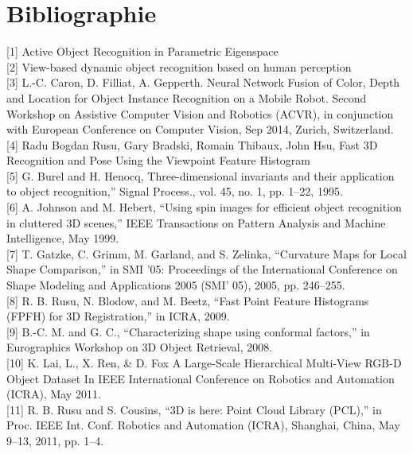 \chapter{Bibliographie}

[1] Active Object Recognition in Parametric Eigenspace \\

[2] View-based dynamic object recognition based on human perception \\

[3] L.-C. Caron, D. Filliat, A. Gepperth. Neural Network Fusion of Color,
Depth and Location for Object Instance Recognition on a Mobile Robot. Second Workshop on
Assistive Computer Vision and Robotics (ACVR), in conjunction with European Conference
on Computer Vision, Sep 2014, Zurich, Switzerland.\\

[4] Radu Bogdan Rusu, Gary Bradski, Romain Thibaux, John Hsu,
Fast 3D Recognition and Pose Using the Viewpoint Feature Histogram \\

[5] G. Burel and H. Henocq, Three-dimensional invariants and their
application to object recognition,” Signal Process., vol. 45, no. 1, pp.
1–22, 1995. \\

[6] A. Johnson and M. Hebert, “Using spin images for efficient object
recognition in cluttered 3D scenes,” IEEE Transactions on Pattern
Analysis and Machine Intelligence, May 1999. \\

[7] T. Gatzke, C. Grimm, M. Garland, and S. Zelinka, “Curvature Maps
for Local Shape Comparison,” in SMI ’05: Proceedings of the International
Conference on Shape Modeling and Applications 2005 (SMI’
05), 2005, pp. 246–255. \\

[8] R. B. Rusu, N. Blodow, and M. Beetz, “Fast Point Feature Histograms
(FPFH) for 3D Registration,” in ICRA, 2009. \\

[9] B.-C. M. and G. C., “Characterizing shape using conformal factors,”
in Eurographics Workshop on 3D Object Retrieval, 2008. \\

[10] K. Lai, L., X. Ren, \& D. Fox  A Large-Scale Hierarchical Multi-View RGB-D Object Dataset In IEEE International Conference on Robotics and Automation (ICRA), May 2011. \\

[11] R. B. Rusu and S. Cousins, “3D is here: Point Cloud Library (PCL),”
in Proc. IEEE Int. Conf. Robotics and Automation (ICRA), Shanghai,
China, May 9–13, 2011, pp. 1–4. \\

